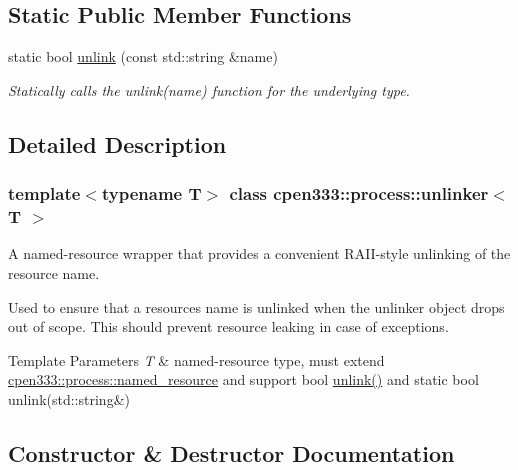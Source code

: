 \subsection*{Static Public Member Functions}
\begin{DoxyCompactItemize}
\item 
static bool \hyperlink{classcpen333_1_1process_1_1unlinker_a00dd4ad138a95aa0173f81fd83c3210e}{unlink} (const std\+::string \&name)
\begin{DoxyCompactList}\small\item\em Statically calls the {\ttfamily unlink(name)} function for the underlying type. \end{DoxyCompactList}\end{DoxyCompactItemize}


\subsection{Detailed Description}
\subsubsection*{template$<$typename T$>$\newline
class cpen333\+::process\+::unlinker$<$ T $>$}

A named-\/resource wrapper that provides a convenient R\+A\+I\+I-\/style unlinking of the resource name. 

Used to ensure that a resource\textquotesingle{}s name is unlinked when the unlinker object drops out of scope. This should prevent resource leaking in case of exceptions.


\begin{DoxyTemplParams}{Template Parameters}
{\em T} & named-\/resource type, must extend \hyperlink{classcpen333_1_1process_1_1named__resource}{cpen333\+::process\+::named\+\_\+resource} and support {\ttfamily bool \hyperlink{classcpen333_1_1process_1_1unlinker_a00dd4ad138a95aa0173f81fd83c3210e}{unlink()}} and {\ttfamily static bool unlink(std\+::string\&)} \\
\hline
\end{DoxyTemplParams}


\subsection{Constructor \& Destructor Documentation}
\mbox{\label{classcpen333_1_1process_1_1unlinker_a44039679bd9939254fc53a5e876d8b8c}} 
